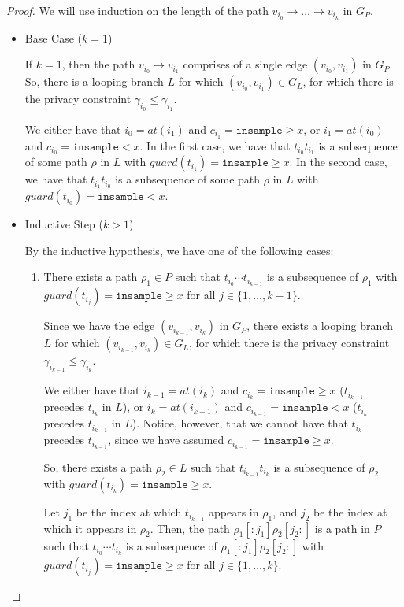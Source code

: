 \documentclass[12pt]{article}
\newcommand{\gguard}[1][x]{\texttt{insample}\geq#1}
\newcommand{\lguard}[1][x]{\texttt{insample} < #1}
\theoremstyle{definition}
\begin{document}
\begin{proof}
    We will use induction on the length of the path $v_{i_0} \to \dots \to v_{i_k}$ in $G_P$. 

    \begin{itemize}
        \item Base Case ($k = 1$)
        
        If $k = 1$, then the path $v_{i_0} \to v_{i_1}$ comprises of a single edge $(v_{i_0}, v_{i_1})$ in $G_P$. So, there is a looping branch $L$ for which $(v_{i_0}, v_{i_1}) \in G_L$, for which there is the privacy constraint $\gamma_{i_0} \leq \gamma_{i_1}$. 
        
        We either have that $i_0 = at(i_1)$ and $c_{i_1} = \gguard$, or $i_1 = at(i_0)$ and $c_{i_0} = \lguard$. In the first case, we have that $t_{i_0} t_{i_1}$ is a subsequence of some path $\rho$ in $L$ with $guard(t_{i_1}) = \gguard$. In the second case, we have that $t_{i_1} t_{i_0}$ is a subsequence of some path $\rho$ in $L$ with $guard(t_{i_0}) = \lguard$.

        \item Inductive Step ($k > 1$)
        
        By the inductive hypothesis, we have one of the following cases: 

        \begin{enumerate}
            \item There exists a path $\rho_1 \in P$ such that $t_{i_0} \cdots t_{i_{k - 1}}$ is a subsequence of $\rho_1$ with $guard(t_{i_j}) = \gguard$ for all $j \in \{1, \dots, k - 1\}$.
            
            Since we have the edge $(v_{i_{k - 1}}, v_{i_k})$ in $G_P$, there exists a looping branch $L$ for which $(v_{i_{k - 1}}, v_{i_k}) \in G_L$, for which there is the privacy constraint $\gamma_{i_{k - 1}} \leq \gamma_{i_k}$.

            We either have that $i_{k - 1} = at(i_k)$ and $c_{i_k} = \gguard$ ($t_{i_{k - 1}}$ precedes $t_{i_k}$ in $L$), or $i_k = at(i_{k - 1})$ and $c_{i_{k - 1}} = \lguard$ ($t_{i_k}$ precedes $t_{i_{k - 1}}$ in $L$). Notice, however, that we cannot have that $t_{i_k}$ precedes $t_{i_{k - 1}}$, since we have assumed $c_{i_{k - 1}} = \gguard$. 

            So, there exists a path $\rho_2 \in L$ such that $t_{i_{k - 1}} t_{i_k}$ is a subsequence of $\rho_2$ with $guard(t_{i_k}) = \gguard$. 

            Let $j_1$ be the index at which $t_{i_{k - 1}}$ appears in $\rho_1$, and $j_2$ be the index at which it appears in $\rho_2$. Then, the path $\rho_1[:j_1] \rho_2[j_2:]$ is a path in $P$ such that $t_{i_0} \cdots t_{i_k}$ is a subsequence of $\rho_1[:j_1] \rho_2[j_2:]$ with $guard(t_{i_j}) = \gguard$ for all $j \in \{1, \dots, k\}$.


\end{enumerate}
\end{itemize}
\end{proof}
\end{document}

